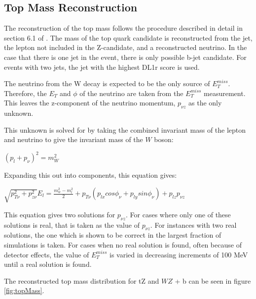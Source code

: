 
\subsection{Top Mass Reconstruction}
\label{subsec:topMass}

 The reconstruction of the top mass follows the procedure described in detail in section 6.1 of \cite{ttZ_paper}. The mass of the top quark candidate is reconstructed from the jet, the lepton not included in the Z-candidate, and a reconstructed neutrino. In the case that there is one jet in the event, there is only possible b-jet candidate. For events with two jets, the jet with the highest DL1r score is used.

The neutrino from the W decay is expected to be the only source of $E_T^{miss}$. Therefore, the $E_T$ and $\phi$ of the neutrino are taken from the $E_T^{miss}$ measurement. This leaves the z-component of the neutrino momentum, $p_{\nu z}$ as the only unknown.

This unknown is solved for by taking the combined invariant mass of the lepton and neutrino to give the invariant mass of the $W$ boson:

\begin{center}
   $(p_l + p_{\nu})^2 = m_W^2$ \\ 
\end{center} 

Expanding this out into components, this equation gives:

\begin{center}
   $\sqrt{p_{T\nu}^2+p_{z\nu}^2}E_l = \frac{m^2_w-m^2_l}{2}+p_{T\nu}(p_{lx} cos\phi_\nu + p_{ly} sin \phi_\nu) + p_{lz} p_{\nu z}$ \\ 
\end{center} 

This equation gives two solutions for $p_{\nu z}$. For cases where only one of these solutions is real, that is taken as the value of $p_{\nu z}$. For instances with two real solutions, the one which is shown to be correct in the largest fraction of simulations is taken. For cases when no real solution is found, often because of detector effects, the value of $E_T^{miss}$ is varied in decreasing increments of 100 MeV until a real solution is found.

The reconstructed top mass distribution for tZ and $WZ$ + b can be seen in figure \ref{fig:topMass}.

